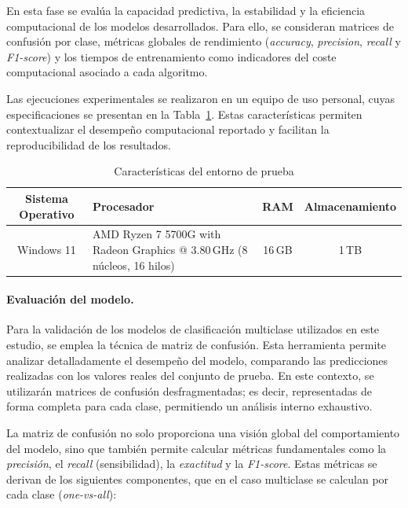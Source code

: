 \documentclass[a4paper,fleqn]{cas-sc}
\begin{document}
	En esta fase se evalúa la capacidad predictiva, la estabilidad y la eficiencia computacional de los modelos desarrollados. 
Para ello, se consideran matrices de confusión por clase, métricas globales de rendimiento 
(\textit{accuracy}, \textit{precision}, \textit{recall} y \textit{F1-score}) y los tiempos de entrenamiento como indicadores del coste computacional asociado a cada algoritmo.

Las ejecuciones experimentales se realizaron en un equipo de uso personal, cuyas especificaciones se presentan en la Tabla~\ref{tab:caracteristicas_entorno}.
Estas características permiten contextualizar el desempeño computacional reportado y facilitan la reproducibilidad de los resultados.

\begin{table}[H]
	\small
	\setlength{\tabcolsep}{7pt}
	\renewcommand{\arraystretch}{1.3} %
	\centering
	\caption[Características del entorno de prueba]{Características del entorno de prueba}
	\label{tab:caracteristicas_entorno}
	\begin{tabular}{cp{5.5cm}cc}
		\hline
		\textbf{Sistema Operativo} & \textbf{Procesador} & \textbf{RAM} & \textbf{Almacenamiento} \\
		\hline
		Windows 11 & AMD Ryzen 7 5700G with Radeon Graphics @ 3.80\,GHz (8 núcleos, 16 hilos) & 16\,GB & 1\,TB \\
		\hline
	\end{tabular}
\end{table}
	

\paragraph{\textbf{Evaluación del modelo.}}

%
Para la validación de los modelos de clasificación multiclase utilizados en este estudio, se emplea la técnica de matriz de confusión. Esta herramienta permite analizar detalladamente el desempeño del modelo, comparando las predicciones realizadas con los valores reales del conjunto de prueba. En este contexto, se utilizarán matrices de confusión {desfragmentadas}; es decir, representadas de forma completa para cada clase, permitiendo un análisis interno exhaustivo.

La matriz de confusión no solo proporciona una visión global del comportamiento del modelo, sino que también permite calcular métricas fundamentales como la \textit{precisión}, el \textit{recall} (sensibilidad), la \textit{exactitud} y la \textit{F1-score}. Estas métricas se derivan de los siguientes componentes, que en el caso multiclase se calculan por cada clase (\textit{one-vs-all}):
\end{document}
